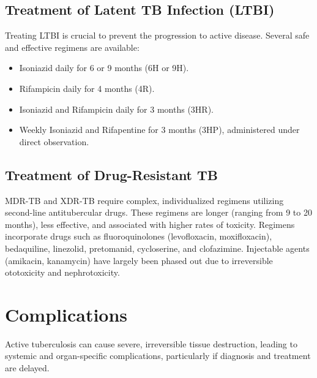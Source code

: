 \subsection*{Treatment of Latent TB Infection (LTBI)}
Treating LTBI is crucial to prevent the progression to active disease. Several safe and effective regimens are available:
\begin{itemize}
    \item Isoniazid daily for 6 or 9 months (6H or 9H).
    \item Rifampicin daily for 4 months (4R).
    \item Isoniazid and Rifampicin daily for 3 months (3HR).
    \item Weekly Isoniazid and Rifapentine for 3 months (3HP), administered under direct observation.
\end{itemize}

\subsection*{Treatment of Drug-Resistant TB}
MDR-TB and XDR-TB require complex, individualized regimens utilizing second-line antitubercular drugs. These regimens are longer (ranging from 9 to 20 months), less effective, and associated with higher rates of toxicity. Regimens incorporate drugs such as fluoroquinolones (levofloxacin, moxifloxacin), bedaquiline, linezolid, pretomanid, cycloserine, and clofazimine. Injectable agents (amikacin, kanamycin) have largely been phased out due to irreversible ototoxicity and nephrotoxicity.

\section*{Complications}
Active tuberculosis can cause severe, irreversible tissue destruction, leading to systemic and organ-specific complications, particularly if diagnosis and treatment are delayed.

